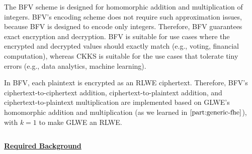 The BFV scheme is designed for homomorphic addition and multiplication of integers. BFV's encoding scheme does not require such approximation issues, because BFV is designed to encode only integers. Therefore, BFV guarantees exact encryption and decryption. BFV is suitable for use cases where the encrypted and decrypted values should exactly match (e.g., voting, financial computation), whereas CKKS is suitable for the use cases that tolerate tiny errors (e.g., data analytics, machine learning).  

In BFV, each plaintext is encrypted as an RLWE ciphertext. Therefore, BFV's ciphertext-to-ciphertext addition, ciphertext-to-plaintext addition, and ciphertext-to-plaintext multiplication are implemented based on GLWE's homomorphic addition and multiplication (as we learned in $\autoref{part:generic-fhe}$), with $k = 1$ to make GLWE an RLWE. 




$ $

\noindent \textbf{\underline{Required Background}}

